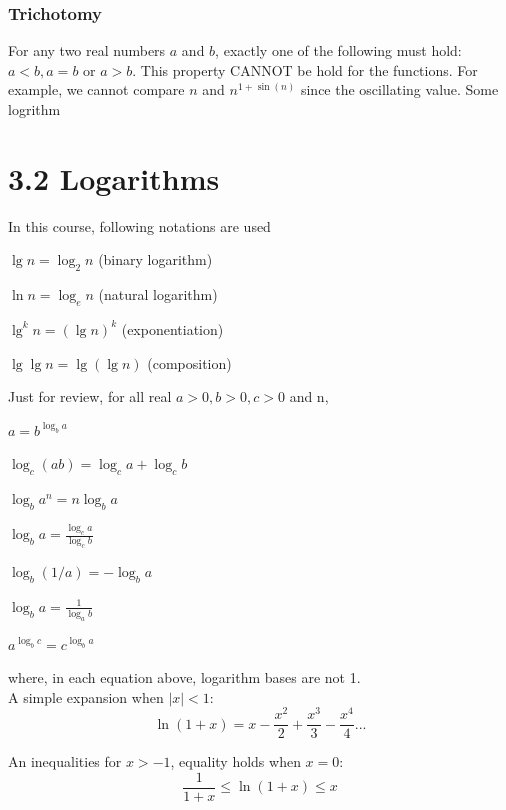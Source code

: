 \documentclass{article}
\begin{document}
\subsubsection*{Trichotomy}
For any two real numbers $a$ and $b$, exactly one of the following must hold: $a < b, a = b$ or $a > b$.
This property CANNOT be hold for the functions. For example, we cannot compare $n$ and $n^{1+\sin(n)}$ since the oscillating value.
Some logrithm 
\section*{3.2 Logarithms}
In this course, following notations are used

\hspace{5.5cm} $\lg n = \log_2 n $ (binary logarithm)

\hspace{5.5cm} $\ln n = \log_e n $ (natural logarithm)

\hspace{5.5cm} $\lg^k n = (\lg n)^k $ (exponentiation)

\hspace{5.5cm} $\lg \lg n = \lg (\lg n) $ (composition)

Just for review, for all real  $a>0, b>0, c>0$ and n, 


\hspace{5.5cm}$a =b^{\log _{b} a}$ 

\hspace{5.5cm}$\log_{c}(a b) =\log_{c} a+\log _{c} b $

\hspace{5.5cm}$\log_{b} a^{n} =n \log_{b} a $

\hspace{5.5cm}$\log_{b} a =\frac{\log_{c} a}{\log _{c} b}$ 

\hspace{5.5cm}$\log_{b}(1 / a) =-\log_{b} a $

\hspace{5.5cm}$\log_{b} a =\frac{1}{\log_{a} b}$ 

\hspace{5.5cm}$a^{\log_{b} c} =c^{\log_{b} a}$


where, in each equation above, logarithm bases are not 1.\\

A simple expansion when $|x| < 1$:
\[\ln(1+x) = x - \frac{x^2}{2}+\frac{x^3}{3}-\frac{x^4}{4} \text{...}\]

An inequalities for $x > -1$, equality holds when $x = 0$:
\[\frac{1}{1+x} \leq \ln(1+x) \leq x\]
\end{document}
